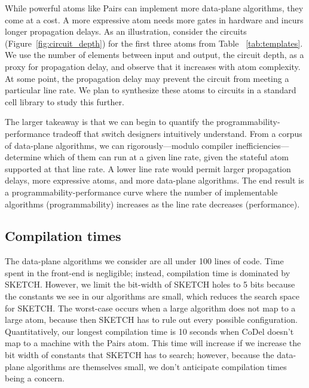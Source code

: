 While powerful atoms like Pairs can implement more data-plane algorithms, they
come at a cost.  A more expressive atom needs more gates in hardware and incurs
longer propagation delays.  As an illustration, consider the circuits
(Figure~\ref{fig:circuit_depth}) for the first three atoms from Table
~\ref{tab:templates}. We use the number of elements between input and output,
the circuit depth, as a proxy for propagation delay, and observe that it
increases with atom complexity. At some point, the propagation delay may
prevent the circuit from meeting a particular line rate.  We plan to synthesize
these atoms to circuits in a standard cell library to study this further.

The larger takeaway is that we can begin to quantify the
programmability-performance tradeoff that switch designers intuitively
understand. From a corpus of data-plane algorithms, we can rigorously---modulo
compiler inefficiencies---determine which of them can run at a given line rate,
given the stateful atom supported at that line rate. A lower line rate would
permit larger propagation delays, more expressive atoms, and more data-plane
algorithms. The end result is a programmability-performance curve where the
number of implementable algorithms (programmability) increases as the line rate
decreases (performance).

\subsection{Compilation times}
The data-plane algorithms we consider are all under 100 lines of code.  Time
spent in the front-end is negligible; instead, compilation time is dominated by
SKETCH. However, we limit the bit-width of SKETCH holes to 5 bits because the
constants we see in our algorithms are small, which reduces the search space
for SKETCH.  The worst-case occurs when a large algorithm does not map to a
large atom, because then SKETCH has to rule out every possible configuration.
Quantitatively, our longest compilation time is 10 seconds when CoDel doesn't
map to a \absmachine machine with the Pairs atom.  This time will increase if
we increase the bit width of constants that SKETCH has to search; however,
because the data-plane algorithms are themselves small, we don't anticipate
compilation times being a concern.

